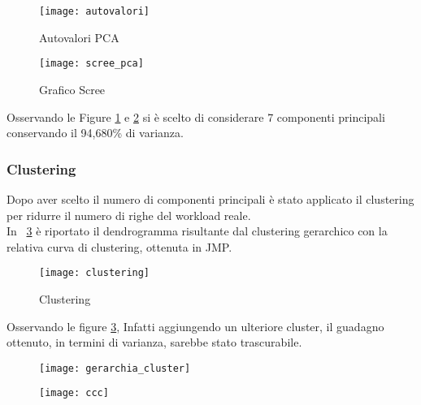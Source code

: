 \begin{figure}[!htbp]
  \centering
  \texttt{[image: autovalori]}
  \caption{Autovalori PCA}
  \label{webserver_autovalori}
\end{figure}
\clearpage

\begin{figure}[!htbp]
  \centering
  \texttt{[image: scree\_pca]}
  \caption{Grafico Scree}
  \label{webserver_scree_pca}
\end{figure}

Osservando le Figure \ref{webserver_autovalori} e \ref{webserver_scree_pca} si è scelto di considerare
7 componenti principali conservando il 94,680\% di varianza.

\clearpage

\subsubsection{Clustering}
Dopo aver scelto il numero di componenti principali è stato applicato il clustering
per ridurre il numero di righe del workload reale.\\
In \figurename~\ref{webserver_clustering} è riportato il dendrogramma risultante dal
clustering gerarchico con la relativa curva di clustering, ottenuta in JMP.\\

\begin{figure}[!htbp]
  \centering
  \texttt{[image: clustering]}
  \caption{Clustering}
  \label{webserver_clustering}
\end{figure}
\clearpage

Osservando le figure \ref{webserver_clustering},
Infatti aggiungendo un ulteriore cluster, il guadagno ottenuto, in termini di varianza,
sarebbe stato trascurabile.\\

\begin{minipage}{\linewidth}
  \centering
  \begin{minipage}{0.48\linewidth}
    \begin{figure}[H]
      \texttt{[image: gerarchia\_cluster]}
    \end{figure}
  \end{minipage}
  \begin{minipage}{0.48\linewidth}
    \begin{figure}[H]
      \texttt{[image: ccc]}
    \end{figure}
  \end{minipage}
\end{minipage}
\label{webserver_clustering}


